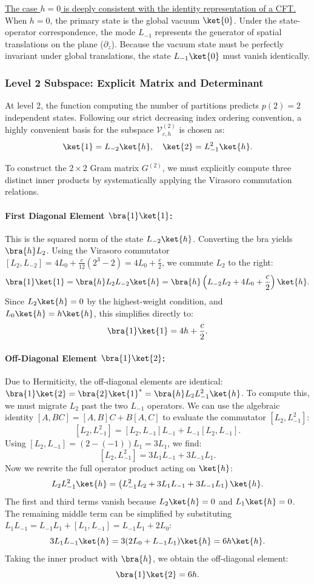 \uline{The case \(h = 0\) is deeply consistent with the identity representation of a CFT.} When \(h=0\), the primary state is the global vacuum \(\ket{0}\). Under the state-operator correspondence, the mode \(L_{-1}\) represents the generator of spatial translations on the plane (\(\partial_z\)). Because the vacuum state must be perfectly invariant under global translations, the state \(L_{-1}\ket{0}\) must vanish identically.

\subsubsection{Level 2 Subspace: Explicit Matrix and Determinant}

At level 2, the function computing the number of partitions predicts \(p(2) = 2\) independent states. Following our strict decreasing index ordering convention, a highly convenient basis for the subspace \(\mathcal{V}_{c,h}^{(2)}\) is chosen as:
\[
    \ket{1} = L_{-2}\ket{h}, \quad \ket{2} = L_{-1}^2\ket{h}.
\]

To construct the \(2 \times 2\) Gram matrix \(G^{(2)}\), we must explicitly compute three distinct inner products by systematically applying the Virasoro commutation relations.

\paragraph{First Diagonal Element \(\bra{1}\ket{1}\):}
This is the squared norm of the state \(L_{-2}\ket{h}\). Converting the bra yields \(\bra{h}L_2\). Using the Virasoro commutator \([L_2, L_{-2}] = 4L_0 + \frac{c}{12}(2^3 - 2) = 4L_0 + \frac{c}{2}\), we commute \(L_2\) to the right:
\[
    \bra{1}\ket{1} = \bra{h} L_2 L_{-2} \ket{h} = \bra{h} \left( L_{-2}L_2 + 4L_0 + \frac{c}{2} \right) \ket{h}.
\]
Since \(L_2\ket{h} = 0\) by the highest-weight condition, and \(L_0\ket{h} = h\ket{h}\), this simplifies directly to:
\[
    \bra{1}\ket{1} = 4h + \frac{c}{2}.
\]

\paragraph{Off-Diagonal Element \(\bra{1}\ket{2}\):}
Due to Hermiticity, the off-diagonal elements are identical: \(\bra{1}\ket{2} = \bra{2}\ket{1}^* = \bra{h}L_2 L_{-1}^2\ket{h}\). To compute this, we must migrate \(L_2\) past the two \(L_{-1}\) operators. We can use the algebraic identity \([A, BC] = [A, B]C + B[A, C]\) to evaluate the commutator \([L_2, L_{-1}^2]\):
\[
    [L_2, L_{-1}^2] = [L_2, L_{-1}]L_{-1} + L_{-1}[L_2, L_{-1}].
\]
Using \([L_2, L_{-1}] = (2 - (-1))L_1 = 3L_1\), we find:
\[
    [L_2, L_{-1}^2] = 3L_1 L_{-1} + 3L_{-1}L_1.
\]
Now we rewrite the full operator product acting on \(\ket{h}\):
\[
    L_2 L_{-1}^2 \ket{h} = \left( L_{-1}^2 L_2 + 3L_1 L_{-1} + 3L_{-1}L_1 \right) \ket{h}.
\]
The first and third terms vanish because \(L_2\ket{h} = 0\) and \(L_1\ket{h} = 0\). The remaining middle term can be simplified by substituting \(L_1 L_{-1} = L_{-1}L_1 + [L_1, L_{-1}] = L_{-1}L_1 + 2L_0\):
\[
    3L_1 L_{-1} \ket{h} = 3(2L_0 + L_{-1}L_1)\ket{h} = 6h\ket{h}.
\]
Taking the inner product with \(\bra{h}\), we obtain the off-diagonal element:
\[
    \bra{1}\ket{2} = 6h.
\]

